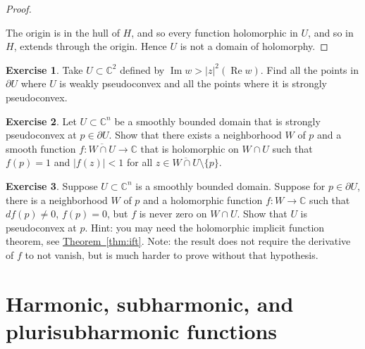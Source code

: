 \documentclass[12pt,openany]{book}
\renewcommand{\Re}{\operatorname{Re}}
\renewcommand{\Im}{\operatorname{Im}}
\newcommand{\sabs}[1]{\lvert {#1} \rvert}
\newcommand{\C}{{\mathbb{C}}}
\theoremstyle{plain}
\theoremstyle{remark}
\theoremstyle{definition}
\newenvironment{exbox}{%
    \def\FrameCommand{\vrule width 1pt \relax\hspace {10pt}}%
    \MakeFramed {\advance \hsize -\width \FrameRestore }%
}{%
    \endMakeFramed
}
\theoremstyle{exercise}
\newtheorem{exercise}{Exercise}[section]
\theoremstyle{example}
\newcommand{\thmref}[1]{\hyperref[#1]{Theorem~\ref*{#1}}}
\begin{document}
\begin{proof}
\begin{center}

\end{center}

The origin is in the hull of $H$, and so
every function holomorphic in $U$, and so in $H$, extends through the origin.
Hence $U$ is not a domain of holomorphy.
\end{proof}

\begin{exbox}
\begin{exercise}
Take $U \subset \C^2$ defined by $\Im w > \sabs{z}^2(\Re w)$.  Find all the
points in $\partial U$ where $U$ is weakly pseudoconvex and all the points
where it is strongly pseudoconvex.
\end{exercise}

\begin{exercise}
Let $U \subset \C^n$ be a smoothly bounded domain that is
strongly pseudoconvex at $p \in \partial U$.  Show that there
exists a neighborhood $W$ of $p$ and a smooth function $f \colon
\overline{W \cap U} \to \C$ that is holomorphic on $W \cap U$
such that $f(p)=1$ and $\sabs{f(z)} < 1$ for all
$z \in \overline{W \cap U} \setminus \{ p \}$.
\end{exercise}

\begin{exercise}
Suppose $U \subset \C^n$ is a smoothly bounded domain.  Suppose
for $p \in \partial U$, there is a neighborhood $W$ of $p$
and a holomorphic function $f \colon W \to
\C$ such that $df(p) \not= 0$, $f(p) = 0$, but
$f$ is never zero on $W \cap U$.  Show that $U$ is pseudoconvex
at $p$.  Hint: you may need the holomorphic implicit function theorem, see
\thmref{thm:ift}.
Note: the result does not require the derivative of $f$ to not vanish, but is
much harder to prove without that hypothesis.
\end{exercise}
\end{exbox}


\section{Harmonic, subharmonic, and plurisubharmonic functions}

\end{document}
